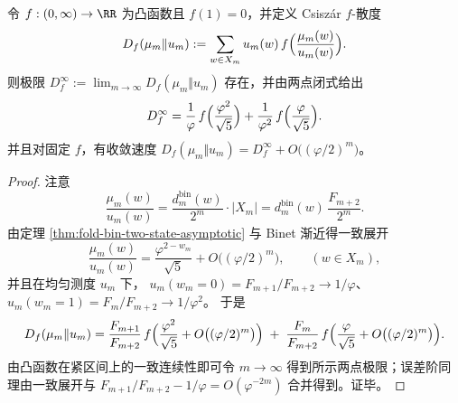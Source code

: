 \begin{proposition}\label{prop:fold-bin-f-divergence-collapse}
令 \(f:(0,\infty)\to\RR\) 为凸函数且 \(f(1)=0\)，并定义 Csiszár \(f\)-散度
\[
D_f(\mu_m\Vert u_m):=\sum_{w\in X_m}u_m(w)\,f\Bigl(\frac{\mu_m(w)}{u_m(w)}\Bigr).
\]
则极限 \(D_f^\infty:=\lim_{m\to\infty}D_f(\mu_m\Vert u_m)\) 存在，并由两点闭式给出
\[
D_f^\infty=\frac{1}{\varphi}\,f\Bigl(\frac{\varphi^2}{\sqrt5}\Bigr)+\frac{1}{\varphi^2}\,f\Bigl(\frac{\varphi}{\sqrt5}\Bigr).
\]
并且对固定 \(f\)，有收敛速度 \(D_f(\mu_m\Vert u_m)=D_f^\infty+O\bigl((\varphi/2)^m\bigr)\)。
\end{proposition}

\begin{proof}
注意
\[
\frac{\mu_m(w)}{u_m(w)}=\frac{d^{\mathrm{bin}}_m(w)}{2^m}\cdot |X_m|
=d^{\mathrm{bin}}_m(w)\,\frac{F_{m+2}}{2^m}.
\]
由定理 \ref{thm:fold-bin-two-state-asymptotic} 与 Binet 渐近得一致展开
\[
\frac{\mu_m(w)}{u_m(w)}
=\frac{\varphi^{2-w_m}}{\sqrt5}+O\bigl((\varphi/2)^m\bigr),
\qquad (w\in X_m),
\]
并且在均匀测度 \(u_m\) 下，
\(
u_m(w_m=0)=F_{m+1}/F_{m+2}\to 1/\varphi
\)、
\(
u_m(w_m=1)=F_m/F_{m+2}\to 1/\varphi^2
\)。
于是
\[
D_f(\mu_m\Vert u_m)
=\frac{F_{m+1}}{F_{m+2}}\,f\Bigl(\frac{\varphi^2}{\sqrt5}+O\bigl((\varphi/2)^m\bigr)\Bigr)
\;+\;\frac{F_m}{F_{m+2}}\,f\Bigl(\frac{\varphi}{\sqrt5}+O\bigl((\varphi/2)^m\bigr)\Bigr).
\]
由凸函数在紧区间上的一致连续性即可令 \(m\to\infty\) 得到所示两点极限；误差阶同理由一致展开与 \(F_{m+1}/F_{m+2}-1/\varphi=O(\varphi^{-2m})\) 合并得到。证毕。
\end{proof}

